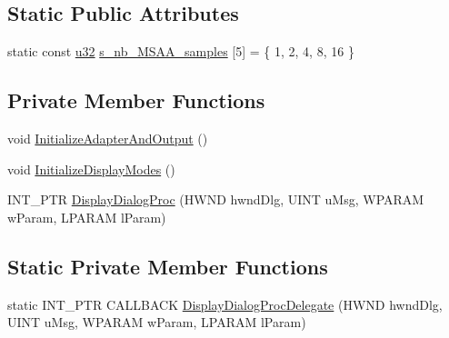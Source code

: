 \subsection*{Static Public Attributes}
\begin{DoxyCompactItemize}
\item 
static const \hyperlink{namespacemage_af2b398bf98eb10351f49cad73fe2cc73}{u32} \hyperlink{classmage_1_1_display_configurator_a771f4899655925cb969ff876b2141e6c}{s\+\_\+nb\+\_\+\+M\+S\+A\+A\+\_\+samples} \mbox{[}5\mbox{]} = \{ 1, 2, 4, 8, 16 \}
\end{DoxyCompactItemize}
\subsection*{Private Member Functions}
\begin{DoxyCompactItemize}
\item 
void \hyperlink{classmage_1_1_display_configurator_a03fd2c38f6fdb6fbc8ff429a7d0d2a89}{Initialize\+Adapter\+And\+Output} ()
\item 
void \hyperlink{classmage_1_1_display_configurator_a90ecffb8d93768464bb1698531a34db7}{Initialize\+Display\+Modes} ()
\item 
I\+N\+T\+\_\+\+P\+TR \hyperlink{classmage_1_1_display_configurator_a6b43b4d9a5e5beeee435bf93fc9865ef}{Display\+Dialog\+Proc} (H\+W\+ND hwnd\+Dlg, U\+I\+NT u\+Msg, W\+P\+A\+R\+AM w\+Param, L\+P\+A\+R\+AM l\+Param)
\end{DoxyCompactItemize}
\subsection*{Static Private Member Functions}
\begin{DoxyCompactItemize}
\item 
static I\+N\+T\+\_\+\+P\+TR C\+A\+L\+L\+B\+A\+CK \hyperlink{classmage_1_1_display_configurator_a3a15e6afa93904c2aaab6c4f5c501fb4}{Display\+Dialog\+Proc\+Delegate} (H\+W\+ND hwnd\+Dlg, U\+I\+NT u\+Msg, W\+P\+A\+R\+AM w\+Param, L\+P\+A\+R\+AM l\+Param)
\end{DoxyCompactItemize}
